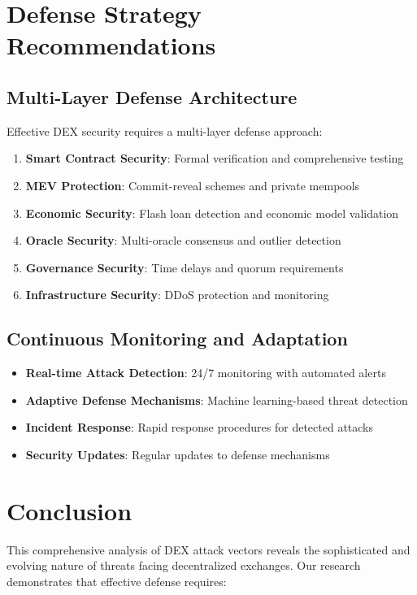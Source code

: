 \documentclass[11pt,a4paper]{article}
\begin{document}
\section{Defense Strategy Recommendations}

\subsection{Multi-Layer Defense Architecture}

Effective DEX security requires a multi-layer defense approach:

\begin{enumerate}
\item \textbf{Smart Contract Security}: Formal verification and comprehensive testing
\item \textbf{MEV Protection}: Commit-reveal schemes and private mempools
\item \textbf{Economic Security}: Flash loan detection and economic model validation
\item \textbf{Oracle Security}: Multi-oracle consensus and outlier detection
\item \textbf{Governance Security}: Time delays and quorum requirements
\item \textbf{Infrastructure Security}: DDoS protection and monitoring
\end{enumerate}

\subsection{Continuous Monitoring and Adaptation}

\begin{itemize}
\item \textbf{Real-time Attack Detection}: 24/7 monitoring with automated alerts
\item \textbf{Adaptive Defense Mechanisms}: Machine learning-based threat detection
\item \textbf{Incident Response}: Rapid response procedures for detected attacks
\item \textbf{Security Updates}: Regular updates to defense mechanisms
\end{itemize}

\section{Conclusion}

This comprehensive analysis of DEX attack vectors reveals the sophisticated and evolving nature of threats facing decentralized exchanges. Our research demonstrates that effective defense requires:
\end{document}
